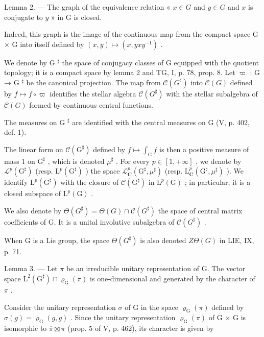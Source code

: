 Lemma 2. --- The graph of the equivalence relation « \(x \in G\) and \(y \in G\) and \(x\) is conjugate to \(y\) » in G is closed.

Indeed, this graph is the image of the continuous map from the compact space G × G into itself defined by \((x, y) \mapsto (x, yxy^{-1})\) .

We denote by G \(^{\sharp}\) the space of conjugacy classes of G equipped with the quotient topology; it is a compact space by lemma 2 and TG, I, p. 78, prop. 8. Let \(\varpi\) : G → G \(^{\sharp}\) be the canonical projection. The map from \(\mathcal{C}(G^{\sharp})\) into \(\mathcal{C}(G)\) defined by \(f \mapsto f \circ \varpi\) identifies the stellar algebra \(\mathcal{C}(G^{\sharp})\) with the stellar subalgebra of \(\mathcal{C}(G)\) formed by continuous central functions.

The measures on G \(^{\sharp}\) are identified with the central measures on G (V, p. 402, def. 1).

The linear form on \(\mathcal{C}(\mathrm{G}^{\sharp})\) defined by \(f\mapsto\int_{\mathrm{G}}f\) is then a positive measure of mass 1 on \(\mathrm{G}^{\sharp}\) , which is denoted \(\mu^{\sharp}\) . For every \(p\in[1,+\infty]\) , we denote by \(\mathcal{L}^{p}(\mathrm{G}^{\sharp})\) (resp. \(\mathrm{L}^{p}(\mathrm{G}^{\sharp})\) ) the space \(\mathcal{L}_{\mathbf{C}}^{p}(\mathrm{G}^{\sharp},\mu^{\sharp})\) (resp. \(\mathrm{L}_{\mathbf{C}}^{p}(\mathrm{G}^{\sharp},\mu^{\sharp})\) ). We identify \(\mathrm{L}^{p}(\mathrm{G}^{\sharp})\) with the closure of \(\mathcal{C}(\mathrm{G}^{\sharp})\) in \(\mathrm{L}^{p}(\mathrm{G})\) ; in particular, it is a closed subspace of \(\mathrm{L}^{p}(\mathrm{G})\) .

We also denote by \(\Theta(G^{\sharp}) = \Theta(G) \cap \mathcal{C}(G^{\sharp})\) the space of central matrix coefficients of G. It is a unital involutive subalgebra of \(\mathcal{C}(G^{\sharp})\) .

When G is a Lie group, the space \(\Theta(G^{\sharp})\) is also denoted \(Z\Theta(G)\) in LIE, IX, p. 71.

Lemma 3. --- Let \(\pi\) be an irreducible unitary representation of G. The vector space \(\mathrm{L}^2 (\mathrm{G}^\sharp)\cap \varrho_{\mathrm{G}}(\pi)\) is one-dimensional and generated by the character of \(\pi\) .

Consider the unitary representation \(\sigma\) of G in the space \(\varrho_{\mathrm{G}}(\pi)\) defined by \(\sigma(g) = \varrho_{\mathrm{G}}(g, g)\) . Since the unitary representation \(\varrho_{\mathrm{G}}(\pi)\) of G × G is isomorphic to \(\overline{\pi} \boxtimes \pi\) (prop. 5 of V, p. 462), its character is given by

